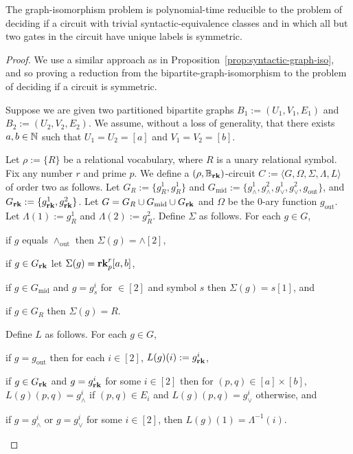 \documentclass[../paper.tex]{subfiles}
\begin{document}
\begin{prop}
  The graph-isomorphism problem is polynomial-time reducible to the problem of
  deciding if a circuit with trivial syntactic-equivalence classes and in which
  all but two gates in the circuit have unique labels is symmetric.
  \label{prop:graph-iso-symmetric}
\end{prop}
\begin{proof}
  We use a similar approach as in Proposition~\ref{prop:syntactic-graph-iso},
  and so proving a reduction from the bipartite-graph-isomorphism to the problem
  of deciding if a circuit is symmetric.
 
  Suppose we are given two partitioned bipartite graphs $B_1 := (U_1, V_1, E_1)$
  and $B_2 := (U_2, V_2, E_2)$. We assume, without a loss of generality, that
  there exists $a, b \in \mathbb{N}$ such that $U_1 = U_2 = [a]$ and $V_1 = V_2 =
  [b]$.

  Let $\rho:= \{R\}$ be a relational vocabulary, where $R$ is a unary relational
  symbol. Fix any number $r$ and prime $p$. We define a $(\rho, \mathbb{B}_{\text{\textbf{rk}}})$-circuit $C
  := \langle G, \Omega, \Sigma, \Lambda, L \rangle$ of order two as follows. Let
  $G_{R} := \{g^1_{R}, g^1_{R}\}$ and $G_{\text{mid}} := \{g^1_{\land},
  g^2_\land, g^1_\lor, g^2_\lor , g_{\text{out}}\}$, and $G_{\text{\textbf{rk}}} : = \{
  g^1_{\text{\textbf{rk}}}, g^2_{\text{\textbf{rk}}}\}$. Let $G = G_R \cup G_{\text{mid}} \cup G_{\text{\textbf{rk}}}$
  and $\Omega$ be the $0$-ary function $g_{\text{out}}$. Let $\Lambda(1) :=
  g^1_{R}$ and $\Lambda(2) := g^2_{R}$. Define $\Sigma$ as follows. For each $g
  \in G$,
  \begin{itemizens}
  \item if $g$ equals $\land_{\text{out}}$ then $\Sigma(g) = \land[2]$,
  \item if $g \in G_{\text{\textbf{rk}}}$ let $\Sigma(g) = \text{\textbf{rk}}^r_p [a,b]$,
  \item if $g \in G_{\text{mid}}$ and $g = g^i_s$ for $ \in [2]$ and symbol $s$
    then $\Sigma(g) = s[1]$, and
  \item if $g \in G_R$ then $\Sigma(g) = R$.
  \end{itemizens}
  Define $L$ as follows. For each $g \in G$,
  \begin{itemizens}
  \item if $g = g_{\text{out}}$ then for each $i \in [2]$, $L(g)(i) :=
    g^i_{\text{\textbf{rk}}}$,
  \item if $g \in G_{\text{\textbf{rk}}}$ and $g = g^i_{\text{\textbf{rk}}}$ for some $i \in [2]$ then for
    $(p,q) \in [a]\times [b]$, $L(g)(p,q) = g^i_\land$ if $(p,q) \in E_i$ and
    $L(g)(p,q) = g^i_\lor$ otherwise, and
  \item if $g = g^i_\land$ or $g = g^i_{\lor}$ for some $i \in [2]$, then
    $L(g)(1) = \Lambda^{-1}(i)$.
  \end{itemizens}



\end{proof}
\end{document}
